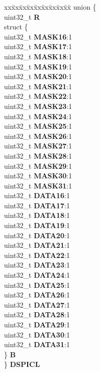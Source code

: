 \begin{DoxyCompactItemize}
\begin{tabbing}
\end{tabbing}\item 
\mbox{\label{structSIU__tag_aeb729148c2d3c2bb381d3e73ed6134bb}} 
\begin{tabbing}
xx\=xx\=xx\=xx\=xx\=xx\=xx\=xx\=xx\=\kill
union \{\\
\>uint32\_t {\bfseries R}\\
\>struct \{\\
\>\>uint32\_t {\bfseries MASK16}:1\\
\>\>uint32\_t {\bfseries MASK17}:1\\
\>\>uint32\_t {\bfseries MASK18}:1\\
\>\>uint32\_t {\bfseries MASK19}:1\\
\>\>uint32\_t {\bfseries MASK20}:1\\
\>\>uint32\_t {\bfseries MASK21}:1\\
\>\>uint32\_t {\bfseries MASK22}:1\\
\>\>uint32\_t {\bfseries MASK23}:1\\
\>\>uint32\_t {\bfseries MASK24}:1\\
\>\>uint32\_t {\bfseries MASK25}:1\\
\>\>uint32\_t {\bfseries MASK26}:1\\
\>\>uint32\_t {\bfseries MASK27}:1\\
\>\>uint32\_t {\bfseries MASK28}:1\\
\>\>uint32\_t {\bfseries MASK29}:1\\
\>\>uint32\_t {\bfseries MASK30}:1\\
\>\>uint32\_t {\bfseries MASK31}:1\\
\>\>uint32\_t {\bfseries DATA16}:1\\
\>\>uint32\_t {\bfseries DATA17}:1\\
\>\>uint32\_t {\bfseries DATA18}:1\\
\>\>uint32\_t {\bfseries DATA19}:1\\
\>\>uint32\_t {\bfseries DATA20}:1\\
\>\>uint32\_t {\bfseries DATA21}:1\\
\>\>uint32\_t {\bfseries DATA22}:1\\
\>\>uint32\_t {\bfseries DATA23}:1\\
\>\>uint32\_t {\bfseries DATA24}:1\\
\>\>uint32\_t {\bfseries DATA25}:1\\
\>\>uint32\_t {\bfseries DATA26}:1\\
\>\>uint32\_t {\bfseries DATA27}:1\\
\>\>uint32\_t {\bfseries DATA28}:1\\
\>\>uint32\_t {\bfseries DATA29}:1\\
\>\>uint32\_t {\bfseries DATA30}:1\\
\>\>uint32\_t {\bfseries DATA31}:1\\
\>\} {\bfseries B}\\
\} {\bfseries DSPICL}\\


\end{tabbing}
\end{DoxyCompactItemize}
